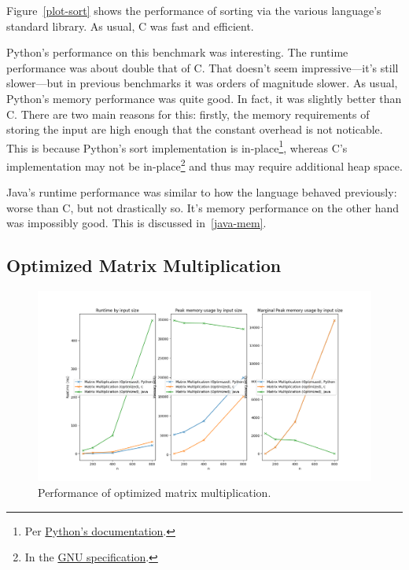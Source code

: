 \documentclass[12pt,letterpaper]{article}
\begin{document}
Figure~\ref{plot-sort} shows the performance of sorting via the various
language's standard library.  As usual, C was fast and efficient.

Python's performance on this benchmark was interesting. The runtime performance
was about double that of C. That doesn't seem impressive—it's still slower—but
in previous benchmarks it was orders of magnitude slower. As usual, Python's
memory performance was quite good. In fact, it was slightly better than C.
There are two main reasons for this: firstly, the memory requirements of
storing the input are high enough that the constant overhead is not noticable.
This is because Python's sort implementation is in-place\footnote{Per
\href{https://docs.python.org/3/library/stdtypes.html#list.sort}{Python's
documentation}.}, whereas C's implementation may not be in-place\footnote{In
the
\href{https://www.gnu.org/software/libc/manual/html_node/Array-Sort-Function.html}{GNU
specification}.} and thus may require additional heap space.

Java's runtime performance was similar to how the language behaved previously:
worse than C, but not drastically so. It's memory performance on the other hand
was impossibly good. This is discussed in~\ref{java-mem}.

\subsection{Optimized Matrix Multiplication}\label{matmul-opt}

\begin{figure}[h!]
  \centering
  \includegraphics[width=\textwidth]{./matmul_optimized-plot.png}
  \caption{Performance of optimized matrix multiplication.}
  \label{plot-matmul-opt}
\end{figure}
\end{document}

